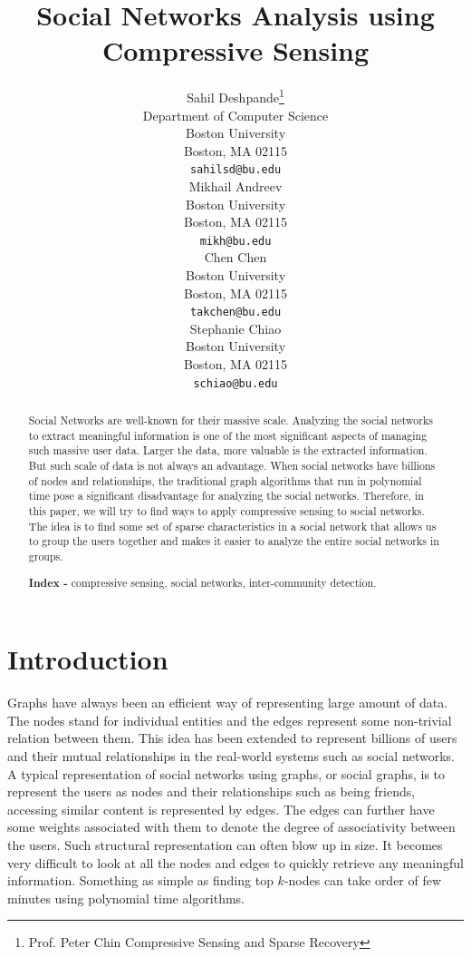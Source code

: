 \documentclass{article}
\title{Social Networks Analysis using Compressive Sensing}
\author{
  Sahil Deshpande\thanks{Prof. Peter Chin
    Compressive Sensing and Sparse Recovery} \\
  Department of Computer Science\\
  Boston University\\
  Boston, MA 02115 \\
  \texttt{sahilsd@bu.edu} \\
  \And
  Mikhail Andreev \\
  Boston University \\
  Boston, MA 02115 \\
  \texttt{mikh@bu.edu} \\
  \AND
  Chen Chen \\
  Boston University \\
  Boston, MA 02115 \\
  \texttt{takchen@bu.edu} \\
  \And
  Stephanie Chiao \\
  Boston University \\
  Boston, MA 02115 \\
  \texttt{schiao@bu.edu} \\
}
\begin{document}

\maketitle

\begin{abstract}
Social Networks are well-known for their massive scale. Analyzing the social networks to extract meaningful information
is one of the most significant aspects of managing such massive user data. Larger the data, more valuable is the
extracted information. But such scale of data is not always an advantage. When social networks have billions of nodes
and relationships, the traditional graph algorithms that run in polynomial time pose a significant disadvantage for
analyzing the social networks. Therefore, in this paper, we will try to find ways to apply compressive sensing to social
networks. The idea is to find some set of sparse characteristics in a social network that allows us to group the users
together and makes it easier to analyze the entire social networks in groups.

\textbf{Index - } compressive sensing, social networks, inter-community detection.
\end{abstract}

\section{Introduction}
Graphs have always been an efficient way of representing large amount of data. The nodes stand for individual entities
and the edges represent some non-trivial relation between them. This idea has been extended to represent billions of
users and their mutual relationships in the real-world systems such as social networks. A typical representation of
social networks using graphs, or social graphs, is to represent the users as nodes and their relationships such as being
friends, accessing similar content is represented by edges. The edges can further have some weights associated with them
to denote the degree of associativity between the users. Such structural representation can often blow up in size. It
becomes very difficult to look at all the nodes and edges to quickly retrieve any meaningful information. Something as
simple as finding top $k$-nodes can take order of few minutes using polynomial time algorithms. 
\end{document}
